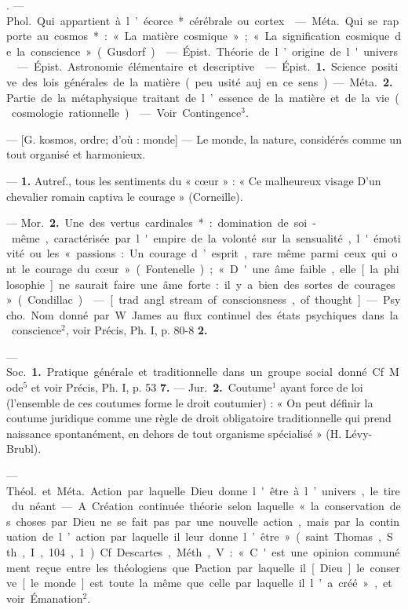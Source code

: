 \begin{itemize}[leftmargin=1cm, label=, itemsep=11pt]
. — \si{Phol.} Qui. appartient à
l’écorce* cérébrale ou cortex.

 — \si{Méta.} Qui se rapporte au
cosmos* : « La matière cosmique » ;
« La signification cosmique de la
conscience » (Gusdorf).

 — \si{Épist.} Théorie de
l’origine de l'univers.

. — \si{Épist.} Astronomie
élémentaire et descriptive.

 — \si{Épist.} {\bf 1.} Science positive des lois générales de la matière
(peu usité auj. en ce sens). — \si{Méta.}
 {\bf 2.} Partie de la métaphysique traitant de l’essence de la matière et de
la vie (cosmologie rationnelle).

 — Voir
Contingence$^3$.

 — [G. kosmos, ordre; d'où :
monde] — Le monde, la nature,
considérés comme un tout organisé
et harmonieux.

 — {\bf 1.} Autref., tous les sentiments du « cœur » : « Ce malheureux
visage D'un chevalier romain captiva
le courage » (Corneille).

— \si{Mor.}  {\bf 2.} Une des vertus cardinales* : domination de soi-même,
caractérisée par l'empire de la volonté sur la sensualité, l'émotivité
ou les « passions : Un courage d’esprit, rare même parmi ceux qui ont
le courage du cœur » (Fontenelle);
« D'une âme faible, elle [la philosophie] ne saurait faire une âme
forte : il y a bien des sortes de courages » (Condillac).

 —
[trad. angl. stream of conscionsness,
of thought] — \si{Psycho.} Nom donné
par W. James au flux continuel des
états psychiques dans la conscience$^2$,
voir Précis, Ph. I, p. 80-8 {\bf 2.}

 — \si{Soc.} {\bf 1.} Pratique générale
et traditionnelle dans un groupe
social donné. Cf. Mode$^5$ et voir
Précis, Ph. I, p. 53 {\bf 7.} — \si{Jur.}  {\bf 2.} Coutume$^1$ ayant force de loi (l’ensemble
de ces coutumes forme le droit coutumier) : « On peut définir la coutume juridique comme une règle de
droit obligatoire traditionnelle qui
prend naissance spontanément, en
dehors de tout organisme spécialisé » (H. Lévy-Brubl).

 — \si{Théol.} et \si{Méta.} Action par
laquelle Dieu donne l'être à l’univers, le tire du néant. — A Création
continuée théorie selon laquelle
« la conservation des choses par
Dieu ne se fait pas par une nouvelle action, mais par la continuation de l’action par laquelle il leur
donne l’être » (saint Thomas, S. th.,
I, 104, 1). Cf. Descartes, Méth., V :
« C'est une opinion communément
reçue entre les théologiens que
Paction par laquelle il [Dieu] le
conserve [le monde] est toute la
même que celle par laquelle il l’a
créé », et voir Émanation$^2$.


\end{itemize}
